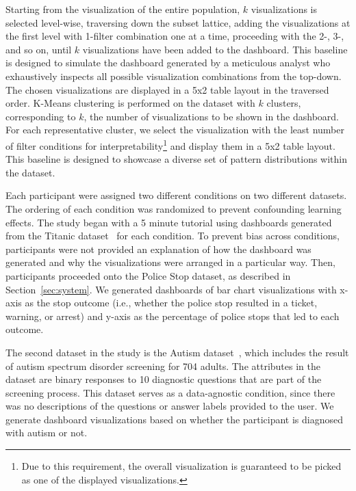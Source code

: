 \stitle{\BFS:} Starting from the visualization of the entire population, $k$ visualizations is selected level-wise, traversing down the subset lattice, adding the visualizations at the first level with 1-filter combination one at a time, proceeding with the 2-, 3-, and so on, until $k$ visualizations have been added to the dashboard. This baseline is designed to simulate the dashboard generated by a meticulous analyst who exhaustively inspects all possible visualization combinations from the top-down. The chosen visualizations are displayed in a 5x2 table layout in the traversed order.
\stitle{\cluster:} K-Means clustering is performed on the dataset with $k$ clusters, corresponding to $k$, the number of visualizations to be shown in the dashboard. For each representative cluster, we select the visualization with the least number of filter conditions for interpretability\footnote{Due to this requirement, the overall visualization is guaranteed to be picked as one of the displayed visualizations.} and display them in a 5x2 table layout. This baseline is designed to showcase a diverse set of pattern distributions within the dataset.
\par Each participant were assigned two different conditions on two different datasets. The ordering of each condition was randomized to prevent confounding learning effects.%
The study began with a 5 minute tutorial using dashboards generated from the Titanic dataset~\cite{titanic} for each condition. To prevent bias across conditions, participants were not provided an explanation of how the dashboard was generated and why the visualizations were arranged in a particular way. Then, participants proceeded onto the Police Stop dataset, as described in Section~\ref{sec:system}.%
We generated dashboards of bar chart visualizations with x-axis as the stop outcome (i.e., whether the police stop resulted in a ticket, warning, or arrest) and y-axis as the percentage of police stops that led to each outcome. 
\par The second dataset in the study is the Autism dataset~\cite{autism}, which includes the result of autism spectrum disorder screening for 704 adults. The attributes in the dataset are binary responses to 10 diagnostic questions that are part of the screening process. This dataset serves as a data-agnostic condition, since there was no descriptions of the questions or answer labels provided to the user. We generate dashboard visualizations based on whether the participant is diagnosed with autism or not. 
